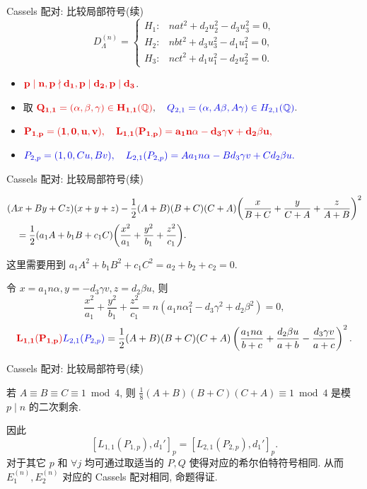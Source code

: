 \documentclass[aspectratio=169,handout]{ctexbeamer}
\begin{document}
\begin{frame}{Cassels 配对: 比较局部符号(续)}
\[D_{\Lambda}^{(n)}=
\begin{cases}
	H_1:& nat^2+d_2u_2^2-d_3u_3^2=0,\\
	H_2:& nbt^2+d_3u_3^2-d_1u_1^2=0,\\
	H_3:& nct^2+d_1u_1^2-d_2u_2^2=0.
\end{cases}\]
\onslide<+->
\begin{itemize}
\item $\alert{p\mid n,p\nmid d_1,p\mid d_2,p\mid d_3}$.
\item 取 $\alert{Q_{1,1}=(\alpha,\beta,\gamma)\in H_{1,1}(\BQ)},\quad
\emph{Q_{2,1}=(\alpha,A\beta,A\gamma)\in H_{2,1}(\BQ)}.$
\item $\alert{P_{1,p}=(1,0,u,v),\quad
L_{1,1}(P_{1,p})=a_1n\alpha-d_3\gamma v+d_2\beta u,}$
\item $\emph{P_{2,p}=(1,0,Cu,Bv),\quad
L_{2,1}(P_{2,p})=Aa_1n\alpha-Bd_3\gamma v+Cd_2\beta u.}$
\end{itemize}
\end{frame}



\begin{frame}{Cassels 配对: 比较局部符号(续)}
\begin{lemma}
	\[\begin{split}
	&(Ax+By+Cz)(x+y+z)-\frac{1}{2}(A+B)(B+C)(C+A)\biggl(
	\frac x{B+C}+
	\frac y{C+A}+
	\frac z{A+B}\biggr)^2\\
	&\quad=\frac{1}{2}(a_1A+b_1B+c_1C)\biggl(\frac{x^2}{a_1}+\frac{y^2}{b_1}+\frac{z^2}{c_1}\biggr).
	\end{split}\]
\end{lemma}
\onslide<+->
这里需要用到 $a_1A^2+b_1B^2+c_1C^2=a_2+b_2+c_2=0$.

\onslide<+->
令 $x=a_1n\alpha,y=-d_3\gamma v, z=d_2\beta u$, 则
\[\frac{x^2}{a_1}+\frac{y^2}{b_1}+\frac{z^2}{c_1}=n(a_1n\alpha_1^2-d_3\gamma^2+d_2\beta^2)=0,\]
\onslide<+->
\[\alert{L_{1,1}(P_{1,p})}\emph{L_{2,1}(P_{2,p})}=\frac12{(A+B)(B+C)(C+A)}\left(\frac{a_1n\alpha}{b+c}+\frac{d_2\beta u}{a+b}-\frac{d_3\gamma v}{a+c}\right)^2.\]
\end{frame}


\begin{frame}{Cassels 配对: 比较局部符号(续)}
\onslide<+->
\begin{lemma}
若 $A\equiv B\equiv C\equiv 1\bmod 4$, 则 $\frac18(A+B)(B+C)(C+A)\equiv 1\bmod 4$ 是模 $p\mid n$ 的二次剩余.
\end{lemma}
\onslide<+->
因此
\[[L_{1,1}(P_{1,p}),d_1']_p=[L_{2,1}(P_{2,p}),d_1']_p.\]
\onslide<+->
对于其它 $p$ 和 $\forall j$ 均可通过取适当的 $P,Q$ 使得对应的希尔伯特符号相同.
\onslide<+->
从而 $E_1^{(n)},E_2^{(n)}$ 对应的 Cassels 配对相同, 命题得证.
\end{frame}
\end{document}
